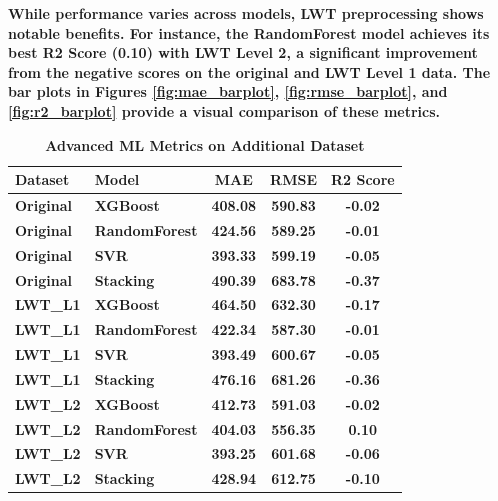 \documentclass[journal]{IEEEtran}
\begin{document}
\textbf{While performance varies across models, LWT preprocessing shows notable benefits. For instance, the RandomForest model achieves its best R2 Score (0.10) with LWT Level 2, a significant improvement from the negative scores on the original and LWT Level 1 data. The bar plots in Figures \ref{fig:mae_barplot}, \ref{fig:rmse_barplot}, and \ref{fig:r2_barplot} provide a visual comparison of these metrics.}

\begin{table}[!h]
    \renewcommand{\arraystretch}{1.15}
    \caption{\textbf{Advanced ML Metrics on Additional Dataset}}
    \label{tab:advanced_metrics}
    \centering
    \begin{tabular}{llccc}
        \hline
        \textbf{Dataset} & \textbf{Model} & \textbf{MAE} & \textbf{RMSE} & \textbf{R2 Score} \\
        \hline
        \textbf{Original} & \textbf{XGBoost} & \textbf{408.08} & \textbf{590.83} & \textbf{-0.02} \\
        \textbf{Original} & \textbf{RandomForest} & \textbf{424.56} & \textbf{589.25} & \textbf{-0.01} \\
        \textbf{Original} & \textbf{SVR} & \textbf{393.33} & \textbf{599.19} & \textbf{-0.05} \\
        \textbf{Original} & \textbf{Stacking} & \textbf{490.39} & \textbf{683.78} & \textbf{-0.37} \\
        \hline
        \textbf{LWT\_L1} & \textbf{XGBoost} & \textbf{464.50} & \textbf{632.30} & \textbf{-0.17} \\
        \textbf{LWT\_L1} & \textbf{RandomForest} & \textbf{422.34} & \textbf{587.30} & \textbf{-0.01} \\
        \textbf{LWT\_L1} & \textbf{SVR} & \textbf{393.49} & \textbf{600.67} & \textbf{-0.05} \\
        \textbf{LWT\_L1} & \textbf{Stacking} & \textbf{476.16} & \textbf{681.26} & \textbf{-0.36} \\
        \hline
        \textbf{LWT\_L2} & \textbf{XGBoost} & \textbf{412.73} & \textbf{591.03} & \textbf{-0.02} \\
        \textbf{LWT\_L2} & \textbf{RandomForest} & \textbf{404.03} & \textbf{556.35} & \textbf{0.10} \\
        \textbf{LWT\_L2} & \textbf{SVR} & \textbf{393.25} & \textbf{601.68} & \textbf{-0.06} \\
        \textbf{LWT\_L2} & \textbf{Stacking} & \textbf{428.94} & \textbf{612.75} & \textbf{-0.10} \\
        \hline
    \end{tabular}
\end{table}
\end{document}
